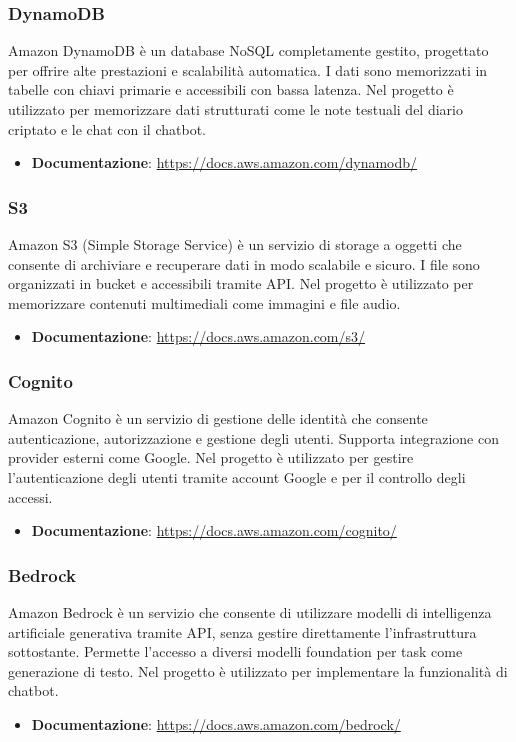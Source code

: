 \documentclass[a4paper,12pt]{article}
\begin{document}
\subsubsection{DynamoDB}
Amazon DynamoDB è un database NoSQL completamente gestito, progettato per offrire alte prestazioni e scalabilità automatica. I dati sono memorizzati in tabelle con chiavi primarie e accessibili con bassa latenza. Nel progetto è utilizzato per memorizzare dati strutturati come le note testuali del diario criptato e le chat con il chatbot.
\begin{itemize}
    \item \textbf{Documentazione}: \url{https://docs.aws.amazon.com/dynamodb/}
\end{itemize}

\subsubsection{S3}
Amazon S3 (Simple Storage Service) è un servizio di storage a oggetti che consente di archiviare e recuperare dati in modo scalabile e sicuro. I file sono organizzati in bucket e accessibili tramite API. Nel progetto è utilizzato per memorizzare contenuti multimediali come immagini e file audio.
\begin{itemize}
    \item \textbf{Documentazione}: \url{https://docs.aws.amazon.com/s3/}
\end{itemize}

\subsubsection{Cognito}
Amazon Cognito è un servizio di gestione delle identità che consente autenticazione, autorizzazione e gestione degli utenti. Supporta integrazione con provider esterni come Google. Nel progetto è utilizzato per gestire l’autenticazione degli utenti tramite account Google e per il controllo degli accessi.
\begin{itemize}
    \item \textbf{Documentazione}: \url{https://docs.aws.amazon.com/cognito/}
\end{itemize}

\subsubsection{Bedrock}
Amazon Bedrock è un servizio che consente di utilizzare modelli di intelligenza artificiale generativa tramite API, senza gestire direttamente l’infrastruttura sottostante. Permette l’accesso a diversi modelli foundation per task come generazione di testo. Nel progetto è utilizzato per implementare la funzionalità di chatbot.
\begin{itemize}
    \item \textbf{Documentazione}: \url{https://docs.aws.amazon.com/bedrock/}
\end{itemize}
\end{document}
